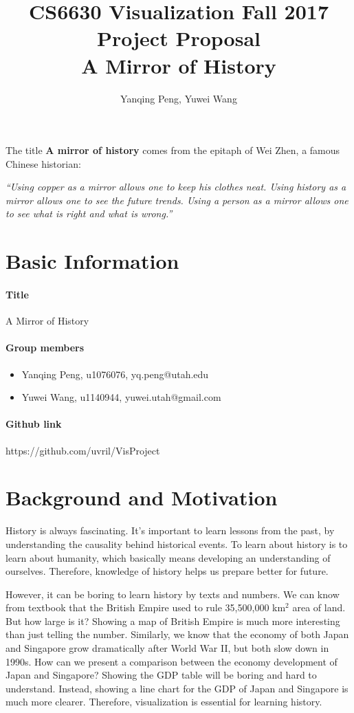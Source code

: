 \documentclass[12pt, fullpage,letterpaper]{article}
\title{CS6630 Visualization Fall 2017 Project Proposal\\ A Mirror of History}
\author{Yanqing Peng, Yuwei Wang}
\begin{document}
\maketitle

The title \textbf{A mirror of history} comes from the epitaph of Wei Zhen,
a famous Chinese historian:

\emph{``Using copper as a mirror allows one to keep his clothes neat. Using
history as a mirror allows one to see the future trends. Using a person as a
mirror allows one to see what is right and what is wrong.''}

\section{Basic Information}
\paragraph{Title} A Mirror of History
\paragraph{Group members}
\begin{itemize}
    \item Yanqing Peng, u1076076, yq.peng@utah.edu
    \item Yuwei Wang, u1140944, yuwei.utah@gmail.com
\end{itemize}
\paragraph{Github link} https://github.com/uvril/VisProject


\section{Background and Motivation}

History is always fascinating.  It's important to learn lessons from the past,
by understanding the causality behind historical events.  To learn about
history is to learn about humanity, which basically means developing an
understanding of ourselves.  Therefore, knowledge of history helps us prepare
better for future.

However, it can be boring to learn history by texts and numbers. We can know
from textbook that the British Empire used to rule 35,500,000 km$^2$ area of
land. But how large is it?  Showing a map of British Empire is much more
interesting than just telling the number.  Similarly, we know that the economy
of both Japan and Singapore grow dramatically after World War II, but both slow
down in 1990s.  How can we present a comparison between the economy development
of Japan and Singapore?  Showing the GDP table will be boring and hard to
understand.  Instead, showing a line chart for the GDP of Japan and Singapore
is much more clearer. Therefore, visualization is essential for learning history.
\end{document}
